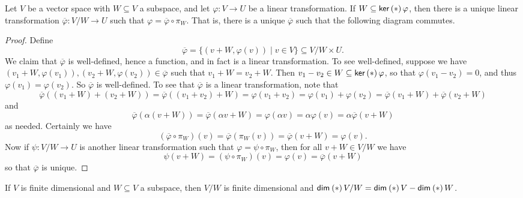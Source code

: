 \documentclass{memoir}
\begin{document}
\begin{prp}
Let $V$ be a vector space with $W \subseteq V$ a subspace, and let $\varphi : V \rightarrow U$ be a linear transformation. If $W \subseteq \operatorname{\mathsf{ker}}\left(*\right){\varphi}$, then there is a unique linear transformation $\overline{\varphi} : V/W \rightarrow U$ such that $\varphi = \overline{\varphi} \circ \pi_W$. That is, there is a unique $\overline{\varphi}$ such that the following diagram commutes.

\begin{center}
\end{center}
\end{prp}

\begin{proof}
Define \[ \overline{\varphi} = \{ (v+W, \varphi(v)) \mid v \in V \} \subseteq V/W \times U. \] We claim that $\overline{\varphi}$ is well-defined, hence a function, and in fact is a linear transformation. To see well-defined, suppose we have $(v_1+W,\varphi(v_1)), (v_2+W,\varphi(v_2)) \in \overline{\varphi}$ such that $v_1+W = v_2+W$. Then $v_1-v_2 \in W \subseteq \operatorname{\mathsf{ker}}\left(*\right){\varphi}$, so that $\varphi(v_1-v_2) = 0$, and thus $\varphi(v_1) = \varphi(v_2)$. So $\overline{\varphi}$ is well-defined. To see that $\overline{\varphi}$ is a linear transformation, note that \[ \overline{\varphi}((v_1+W) + (v_2+W)) = \overline{\varphi}((v_1+v_2)+W) = \varphi(v_1+v_2) = \varphi(v_1) + \varphi(v_2) = \overline{\varphi}(v_1+W) + \overline{\varphi}(v_2+W) \] and \[ \overline{\varphi}(\alpha(v+W)) = \overline{\varphi}(\alpha v+W) = \varphi(\alpha v) = \alpha \varphi(v) = \alpha \overline{\varphi}(v+W) \] as needed. Certainly we have \[ (\overline{\varphi} \circ \pi_W)(v) = \overline{\varphi}(\pi_W(v)) = \overline{\varphi}(v+W) = \varphi(v). \] Now if $\psi : V/W \rightarrow U$ is another linear transformation such that $\varphi = \psi \circ \pi_W$, then for all $v+W \in V/W$ we have \[ \psi(v+W) = (\psi \circ \pi_W)(v) = \varphi(v) = \overline{\varphi}(v+W) \] so that $\overline{\varphi}$ is unique.
\end{proof}

\begin{prp}
If $V$ is finite dimensional and $W \subseteq V$ a subspace, then $V/W$ is finite dimensional and $\operatorname{\mathsf{dim}}_{}\left(*\right){V/W} = \operatorname{\mathsf{dim}}_{}\left(*\right){V} - \operatorname{\mathsf{dim}}_{}\left(*\right){W}$.
\end{prp}
\end{document}
